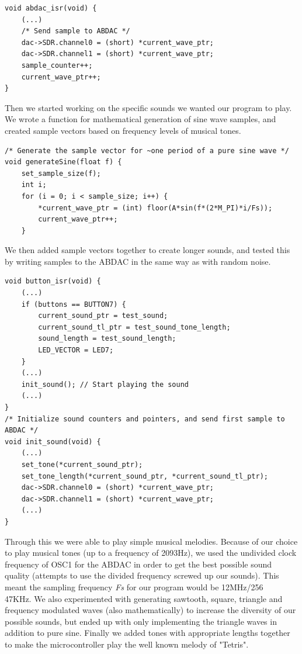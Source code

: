 \documentclass[a4paper,11pt]{article}
\begin{document}
\begin{lstlisting}
void abdac_isr(void) {
	(...)
	/* Send sample to ABDAC */
	dac->SDR.channel0 = (short) *current_wave_ptr;
	dac->SDR.channel1 = (short) *current_wave_ptr;
	sample_counter++;
	current_wave_ptr++;
}
\end{lstlisting}

Then we started working on the specific sounds we wanted our program to play. We wrote a function for mathematical generation of sine wave samples, and created sample vectors based on frequency levels of musical tones. 

\begin{lstlisting}
/* Generate the sample vector for ~one period of a pure sine wave */
void generateSine(float f) {
	set_sample_size(f);
	int i;
	for (i = 0; i < sample_size; i++) {
		*current_wave_ptr = (int) floor(A*sin(f*(2*M_PI)*i/Fs));
		current_wave_ptr++;
	}
\end{lstlisting}

We then added sample vectors together to create longer sounds, and tested this by writing samples to the ABDAC in the same way as with random noise.
\begin{lstlisting}
void button_isr(void) {
	(...)
	if (buttons == BUTTON7) {
		current_sound_ptr = test_sound;
		current_sound_tl_ptr = test_sound_tone_length;
		sound_length = test_sound_length;
		LED_VECTOR = LED7;
	}
	(...)
	init_sound(); // Start playing the sound
	(...)
}
/* Initialize sound counters and pointers, and send first sample to ABDAC */
void init_sound(void) {
	(...)
	set_tone(*current_sound_ptr);
	set_tone_length(*current_sound_ptr, *current_sound_tl_ptr);
	dac->SDR.channel0 = (short) *current_wave_ptr;
	dac->SDR.channel1 = (short) *current_wave_ptr;	
	(...)
}
\end{lstlisting}

Through this we were able to play simple musical melodies. Because of our choice to play musical tones (up to a frequency of 2093Hz), we used the undivided clock frequency of OSC1 for the ABDAC in order to get the best possible sound quality (attempts to use the divided frequency screwed up our sounds). This meant the sampling frequency \textit{Fs} for our program would be 12MHz/256 ~ 47KHz. We also experimented with generating sawtooth, square, triangle and frequency modulated waves (also mathematically) to increase the diversity of our possible sounds, but ended up with only implementing the triangle waves in addition to pure sine. Finally we added tones with appropriate lengths together to make the microcontroller play the well known melody of "Tetris". 
\end{document}
